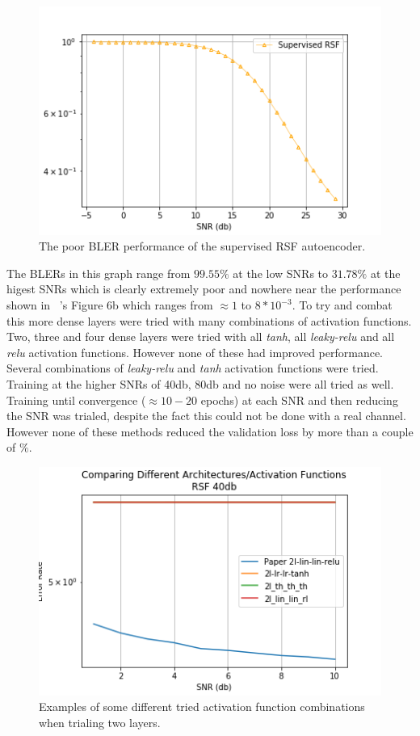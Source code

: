 \documentclass[12pt,onecolumn,letterpaper]{article}
\newcommand{\code}{\textit}
\newcommand\genfigsize{0.5}
\begin{document}
\begin{figure}
   \centering
   \includegraphics[width=\genfigsize\linewidth]{figures/aoudia_paper/autoencoder_rsf_bler.png}
   \caption{The poor BLER performance of the supervised RSF autoencoder.}
   \label{fig:RsfBler}
\end{figure}

The BLERs in this graph range from $99.55\%$ at the low SNRs to $31.78\%$ at the higest SNRs which is clearly extremely poor and nowhere near the performance shown in ~\cite{Aoudia}'s Figure 6b which ranges from $\approx1$ to $8*10^{-3}$. To try and combat this more dense layers were tried with many combinations of activation functions. Two, three and four dense layers were tried with all \code{tanh}, all \code{leaky-relu} and all \code{relu} activation functions. However none of these had improved performance. Several combinations of \code{leaky-relu} and \code{tanh} activation functions were tried. Training at the higher SNRs of 40db, 80db and no noise were all tried as well. Training until convergence ($\approx10-20$ epochs) at each SNR and then reducing the SNR was trialed, despite the fact this could not be done with a real channel. However none of these methods reduced the validation loss by more than a couple of $\%$. 

\begin{figure}
   \centering
   \includegraphics[width=\genfigsize\linewidth]{figures/aoudia_paper/rsf_unsuccessful_alt_archs.png}
   \caption{Examples of some different tried activation function combinations when trialing two layers.}
   \label{fig:RsfActivationFuncCombs}
\end{figure}
\end{document}
